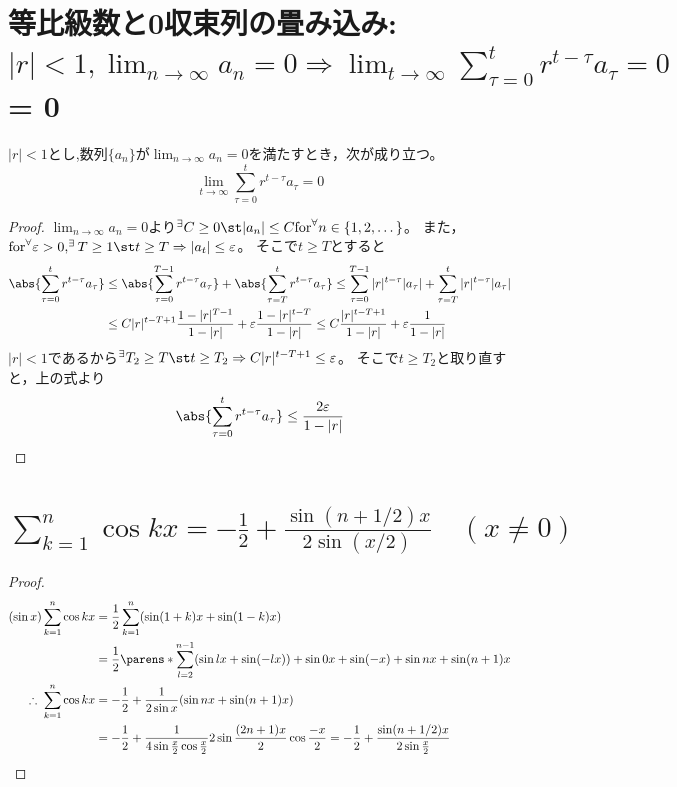     \section{等比級数と0収束列の畳み込み: {\normalsize \texorpdfstring{$|r|<1,\lim_{n\to\infty}a_n=0 \Rightarrow \lim_{t\to\infty}\sum_{\tau=0}^t{r^{t-\tau}a_\tau}=0$}{|r|<1, lim\_\{n→∞\}a\_n=0 ⇒ lim\_\{t→∞\} Σ\_\{τ=0\}\string^t r\string^(t-τ) a\_τ} = 0}}
        \begin{shadebox}
            $|r|<1$とし,数列$\{a_n\}$が$\lim_{n\to\infty}a_n=0$を満たすとき，次が成り立つ。
            \[\lim_{t\to\infty}\sum_{\tau=0}^t{r^{t-\tau}a_\tau}=0\]
        \end{shadebox}
        \begin{proof}
            $\lim_{n\to\infty}a_n=0$より$^\exists C\geq 0\st|a_n|\leq C\mathrm{ for }^\forall n\in\{1,2,\dotsc\}$。
            また，$\mathrm{for }^\forall \varepsilon>0,^\exists T\geq 1\st t\geq T\Rightarrow|a_t|\leq\varepsilon$。
            そこで$t\geq T$とすると
            \begin{align*}
                \abs{\sum_{\tau=0}^t{r^{t-\tau}a_\tau}} &\leq \abs{\sum_{\tau=0}^{T-1}{r^{t-\tau}a_\tau}} + \abs{\sum_{\tau=T}^t{r^{t-\tau}a_\tau}} \leq \sum_{\tau=0}^{T-1}|r|^{t-\tau}|a_\tau| + \sum_{\tau=T}^{t}|r|^{t-\tau}|a_\tau| \\
                &\leq C|r|^{t-T+1}\frac{1-|r|^{T-1}}{1-|r|} + \varepsilon\frac{1-|r|^{t-T}}{1-|r|} \leq C\frac{|r|^{t-T+1}}{1-|r|} + \varepsilon\frac{1}{1-|r|}
            \end{align*}
            $|r|<1$であるから$^\exists T_2\geq T\st t\geq T_2\Rightarrow C|r|^{t-T+1} \leq \varepsilon$。
            そこで$t\geq T_2$と取り直すと，上の式より
            \[\abs{\sum_{\tau=0}^t{r^{t-\tau}a_\tau}} \leq \frac{2\varepsilon}{1-|r|}\]
        \end{proof}
    \section{\texorpdfstring{$\sum_{k=1}^n \cos kx = -\frac{1}{2} + \frac{\sin(n+1/2)x}{2\sin(x/2)} \quad (x\neq 0)$}{Σ\_\{k=1\}\string^n cos(kx) = -1/2 + (sin(n+1/2)x)/(2sin(x/2))}}
        \begin{proof}
            \begin{align*}
                (\sin x) \sum_{k=1}^n \cos kx &= \frac{1}{2}\sum_{k=1}^n (\sin(1+k)x+\sin(1-k)x) \\
                &= \frac{1}{2}\parens*{\sum_{l=2}^{n-1} (\sin lx + \sin(-lx)) + \sin 0x + \sin(-x) + \sin nx + \sin(n+1)x} \\
                \therefore\; \sum_{k=1}^n \cos kx &= -\frac{1}{2} + \frac{1}{2\sin x}(\sin nx + \sin(n+1)x) \\
                &= -\frac{1}{2} + \frac{1}{4\sin\frac{x}{2}\cos\frac{x}{2}}2\sin\frac{(2n+1)x}{2}\cos\frac{-x}{2} = -\frac{1}{2} + \frac{\sin(n+1/2)x}{2\sin\frac{x}{2}}
            \end{align*}
        \end{proof}
